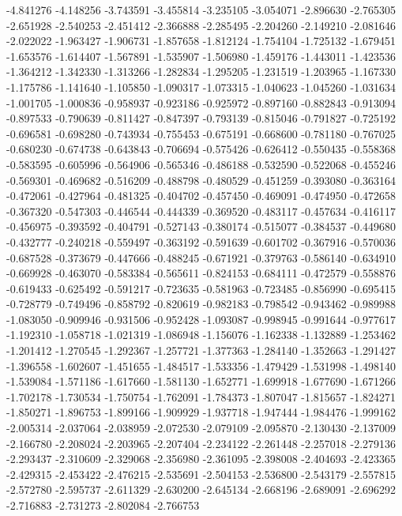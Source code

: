 -4.841276
-4.148256
-3.743591
-3.455814
-3.235105
-3.054071
-2.896630
-2.765305
-2.651928
-2.540253
-2.451412
-2.366888
-2.285495
-2.204260
-2.149210
-2.081646
-2.022022
-1.963427
-1.906731
-1.857658
-1.812124
-1.754104
-1.725132
-1.679451
-1.653576
-1.614407
-1.567891
-1.535907
-1.506980
-1.459176
-1.443011
-1.423536
-1.364212
-1.342330
-1.313266
-1.282834
-1.295205
-1.231519
-1.203965
-1.167330
-1.175786
-1.141640
-1.105850
-1.090317
-1.073315
-1.040623
-1.045260
-1.031634
-1.001705
-1.000836
-0.958937
-0.923186
-0.925972
-0.897160
-0.882843
-0.913094
-0.897533
-0.790639
-0.811427
-0.847397
-0.793139
-0.815046
-0.791827
-0.725192
-0.696581
-0.698280
-0.743934
-0.755453
-0.675191
-0.668600
-0.781180
-0.767025
-0.680230
-0.674738
-0.643843
-0.706694
-0.575426
-0.626412
-0.550435
-0.558368
-0.583595
-0.605996
-0.564906
-0.565346
-0.486188
-0.532590
-0.522068
-0.455246
-0.569301
-0.469682
-0.516209
-0.488798
-0.480529
-0.451259
-0.393080
-0.363164
-0.472061
-0.427964
-0.481325
-0.404702
-0.457450
-0.469091
-0.474950
-0.472658
-0.367320
-0.547303
-0.446544
-0.444339
-0.369520
-0.483117
-0.457634
-0.416117
-0.456975
-0.393592
-0.404791
-0.527143
-0.380174
-0.515077
-0.384537
-0.449680
-0.432777
-0.240218
-0.559497
-0.363192
-0.591639
-0.601702
-0.367916
-0.570036
-0.687528
-0.373679
-0.447666
-0.488245
-0.671921
-0.379763
-0.586140
-0.634910
-0.669928
-0.463070
-0.583384
-0.565611
-0.824153
-0.684111
-0.472579
-0.558876
-0.619433
-0.625492
-0.591217
-0.723635
-0.581963
-0.723485
-0.856990
-0.695415
-0.728779
-0.749496
-0.858792
-0.820619
-0.982183
-0.798542
-0.943462
-0.989988
-1.083050
-0.909946
-0.931506
-0.952428
-1.093087
-0.998945
-0.991644
-0.977617
-1.192310
-1.058718
-1.021319
-1.086948
-1.156076
-1.162338
-1.132889
-1.253462
-1.201412
-1.270545
-1.292367
-1.257721
-1.377363
-1.284140
-1.352663
-1.291427
-1.396558
-1.602607
-1.451655
-1.484517
-1.533356
-1.479429
-1.531998
-1.498140
-1.539084
-1.571186
-1.617660
-1.581130
-1.652771
-1.699918
-1.677690
-1.671266
-1.702178
-1.730534
-1.750754
-1.762091
-1.784373
-1.807047
-1.815657
-1.824271
-1.850271
-1.896753
-1.899166
-1.909929
-1.937718
-1.947444
-1.984476
-1.999162
-2.005314
-2.037064
-2.038959
-2.072530
-2.079109
-2.095870
-2.130430
-2.137009
-2.166780
-2.208024
-2.203965
-2.207404
-2.234122
-2.261448
-2.257018
-2.279136
-2.293437
-2.310609
-2.329068
-2.356980
-2.361095
-2.398008
-2.404693
-2.423365
-2.429315
-2.453422
-2.476215
-2.535691
-2.504153
-2.536800
-2.543179
-2.557815
-2.572780
-2.595737
-2.611329
-2.630200
-2.645134
-2.668196
-2.689091
-2.696292
-2.716883
-2.731273
-2.802084
-2.766753
